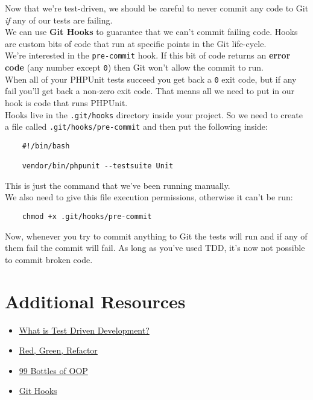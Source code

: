 Now that we're test-driven, we should be careful to never commit any code to Git \textit{if} any of our tests are failing.
\\

We can use \textbf{Git Hooks} to guarantee that we can't commit failing code. Hooks are custom bits of code that run at specific points in the Git life-cycle.
\\

We're interested in the \texttt{pre-commit} hook. If this bit of code returns an \textbf{error code} (any number except \texttt{0}) then Git won't allow the commit to run.
\\

When all of your PHPUnit tests succeed you get back a \texttt{0} exit code, but if any fail you'll get back a non-zero exit code. That means all we need to put in our hook is code that runs PHPUnit.
\\

Hooks live in the \texttt{.git/hooks} directory inside your project. So we need to create a file called \texttt{.git/hooks/pre-commit} and then put the following inside:

\begin{verbatim}
    #!/bin/bash

    vendor/bin/phpunit --testsuite Unit
\end{verbatim}

This is just the command that we've been running manually.
\\

We also need to give this file execution permissions, otherwise it can't be run:

\begin{verbatim}
    chmod +x .git/hooks/pre-commit
\end{verbatim}

Now, whenever you try to commit anything to Git the tests will run and if any of them fail the commit will fail. As long as you've used TDD, it's now not possible to commit broken code.


\section{Additional Resources}

\begin{itemize}[leftmargin=*]
    \item \href{https://www.freecodecamp.org/news/test-driven-development-what-it-is-and-what-it-is-not-41fa6bca02a2/}{What is Test Driven Development?}
    \item \href{https://www.codecademy.com/articles/tdd-red-green-refactor}{Red, Green, Refactor}
    \item \href{https://www.sandimetz.com/99bottles}{99 Bottles of OOP}
    \item \href{https://git-scm.com/book/en/v2/Customizing-Git-Git-Hooks}{Git Hooks}
\end{itemize}
